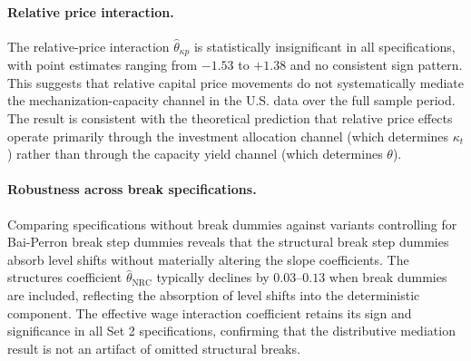 \paragraph{Relative price interaction.}
The relative-price interaction $\hat{\theta}_{\kappa p}$ is
statistically insignificant in all specifications, with point
estimates ranging from $-1.53$ to $+1.38$ and no consistent sign
pattern. This suggests that relative capital price movements do not
systematically mediate the mechanization-capacity channel in the
U.S. data over the full sample period. The result is consistent with
the theoretical prediction that relative price effects operate
primarily through the investment allocation channel (which determines
$\kappa_t$) rather than through the capacity yield channel (which
determines $\theta$).

\paragraph{Robustness across break specifications.}
Comparing specifications without break dummies against variants
controlling for Bai-Perron break step dummies reveals that the
structural break step dummies absorb level shifts without materially
altering the slope coefficients. The structures coefficient
$\hat{\theta}_{\text{NRC}}$ typically declines by $0.03$--$0.13$
when break dummies are included, reflecting the absorption of level
shifts into the deterministic component. The effective wage
interaction coefficient retains its sign and significance in all
Set 2 specifications, confirming that the distributive mediation
result is not an artifact of omitted structural breaks.

